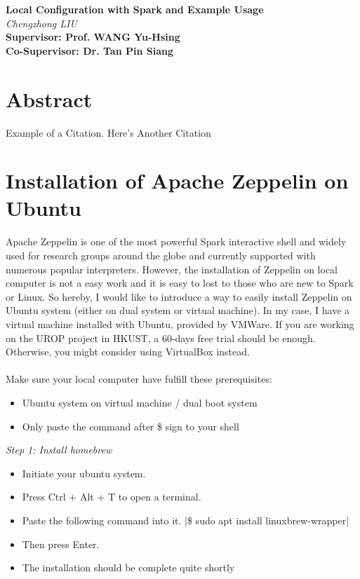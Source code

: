 \documentclass[a4paper, 12pt]{article}
\begin{document}
    \linespread{1.5}

    \begin{center}
        \Huge\textbf{Local Configuration with Spark and Example Usage}\\
        \large\textit{Chengzhong LIU}\\
        \normalsize\textbf{Supervisor: Prof. WANG Yu-Hsing}\\
        \normalsize\textbf{Co-Supervisor: Dr. Tan Pin Siang}
    \end{center}

    \section*{Abstract}
    Example of a Citation\cite[p.219]{Robotics}. Here's Another Citation\cite{Flueck}
    
    \section*{Installation of Apache Zeppelin on Ubuntu}
    Apache Zeppelin is one of the most powerful Spark interactive shell and widely used for research groups
    around the globe and currently supported with numerous popular interpreters\cite{Zeppelin}. However, 
    the installation of Zeppelin on local computer is not a easy work and it is easy to lost to those who
    are new to Spark or Linux. So hereby, I would like to introduce a way to easily install Zeppelin on 
    Ubuntu system (either on dual system or virtual machine). In my case, I have a virtual machine installed
    with Ubuntu, provided by VMWare\cite{VMWare}. If you are working on the UROP project in HKUST, a 60-days
    free trial should be enough. Otherwise, you might consider using VirtualBox\cite{VirtualBox} instead.\\
    \\
    Make sure your local computer have fulfill these prerequisites:
    \begin{itemize}
        \item Ubuntu system on virtual machine / dual boot system
        \item Only paste the command after \$ sign to your shell
    \end{itemize}

    \normalsize\textit{Step 1: Install homebrew}
    \begin{itemize}
        \item Initiate your ubuntu system.
        \item Press Ctrl + Alt + T to open a terminal.
        \item Paste the following command into it.
        |\$ sudo apt install linuxbrew-wrapper|
        \item Then press Enter.
        \item The installation should be complete quite shortly
    \end{itemize}
\end{document}
